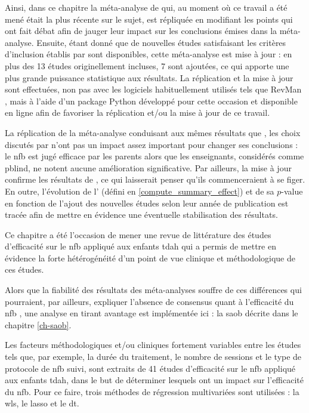 Ainsi, dans ce chapitre la méta-analyse de \citet{Cortese2016} qui, au moment où ce travail a été mené était la plus récente sur le sujet, 
est répliquée en modifiant les points qui ont fait débat \citep{Micoulaud2016} afin de jauger leur impact sur les conclusions émises dans la méta-analyse. 
Ensuite, étant donné que de nouvelles études satisfaisant les critères d'inclusion établis par \citet{Cortese2016} sont disponibles, cette méta-analyse 
est mise à jour : en plus des 13 études originellement incluses, 7 sont ajoutées, ce qui apporte une plus grande puissance statistique aux résultats. 
La réplication et la mise à jour sont effectuées, non pas avec les logiciels 
habituellement utilisés tels que RevMan \citep{Revman}, mais à l'aide d'un package Python développé pour cette occasion et disponible en ligne afin de favoriser 
la réplication et/ou la mise à jour de ce travail. 

La réplication de la méta-analyse conduisant aux mêmes résultats que \citet{Cortese2016}, les choix discutés par \citet{Micoulaud2016} n'ont pas un impact assez
important pour changer ses conclusions : le \gls{nfb} est jugé efficace par les parents alors que les enseignants, considérés comme \gls{pblind}, ne notent aucune
amélioration significative. Par ailleurs, la mise à jour confirme les résultats de \citep{Cortese2016}, ce qui laisserait penser qu'ils commenceraient
à se figer. En outre, l'évolution de l' (défini en \ref{compute_summary_effect}) et de sa $p$-value en fonction de l'ajout des nouvelles études selon
leur année de publication est tracée afin de mettre en évidence une éventuelle stabilisation des résultats. 

Ce chapitre a été l'occasion de mener une revue de littérature des études d'efficacité sur le \gls{nfb} appliqué aux enfants \gls{tdah} 
qui a permis de mettre en évidence la forte hétérogénéité d'un point de vue clinique et méthodologique de ces études. 

Alors que la fiabilité des résultats des méta-analyses souffre de ces différences qui pourraient, par ailleurs, expliquer l'absence de consensus quant 
à l'efficacité du \gls{nfb} \citep{Alkoby2017}, une analyse en tirant avantage est implémentée ici : la \gls{saob} décrite dans le chapitre \ref{ch-saob}. 

Les facteurs méthodologiques et/ou cliniques fortement variables entre les études tels que, par exemple, la durée du traitement, le nombre de sessions et le type 
de protocole de \gls{nfb} suivi, sont extraits de 41 études d'efficacité sur le \gls{nfb} appliqué aux enfants \gls{tdah}, dans le but de déterminer lesquels 
ont un impact sur l'efficacité du \gls{nfb}. Pour ce faire, trois méthodes de régression multivariées sont utilisées : la \gls{wls}, le \gls{lasso} et le \gls{dt}. 

